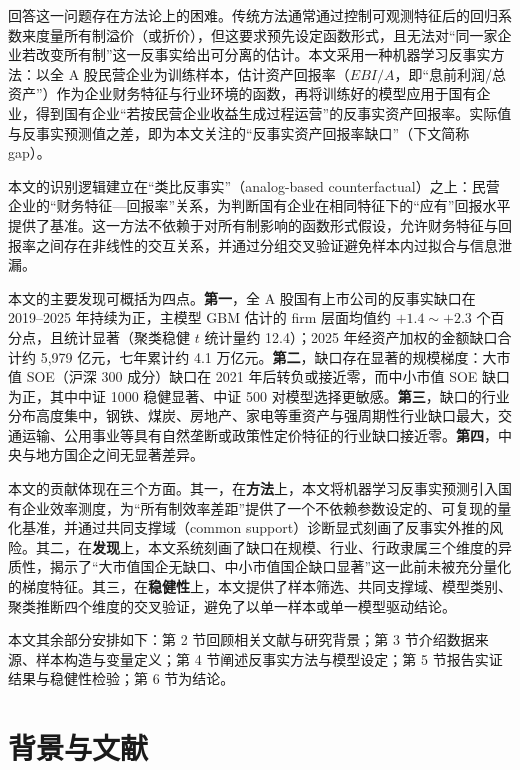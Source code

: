 \documentclass[11pt,a4paper]{ctexart}
\begin{document}
回答这一问题存在方法论上的困难。传统方法通常通过控制可观测特征后的回归系数来度量所有制溢价（或折价），但这要求预先设定函数形式，且无法对“同一家企业若改变所有制”这一反事实给出可分离的估计。本文采用一种机器学习反事实方法：以全 A 股民营企业为训练样本，估计资产回报率（$EBI/A$，即“息前利润/总资产”）作为企业财务特征与行业环境的函数，再将训练好的模型应用于国有企业，得到国有企业“若按民营企业收益生成过程运营”的反事实资产回报率。实际值与反事实预测值之差，即为本文关注的“反事实资产回报率缺口”（下文简称 gap）。

本文的识别逻辑建立在“类比反事实”（analog-based counterfactual）之上：民营企业的“财务特征—回报率”关系，为判断国有企业在相同特征下的“应有”回报水平提供了基准。这一方法不依赖于对所有制影响的函数形式假设，允许财务特征与回报率之间存在非线性的交互关系，并通过分组交叉验证避免样本内过拟合与信息泄漏。

本文的主要发现可概括为四点。\textbf{第一}，全 A 股国有上市公司的反事实缺口在 2019--2025 年持续为正，主模型 GBM 估计的 firm 层面均值约 $+1.4\sim+2.3$ 个百分点，且统计显著（聚类稳健 $t$ 统计量约 12.4）；2025 年经资产加权的金额缺口合计约 5{,}979 亿元，七年累计约 4.1 万亿元。\textbf{第二}，缺口存在显著的规模梯度：大市值 SOE（沪深 300 成分）缺口在 2021 年后转负或接近零，而中小市值 SOE 缺口为正，其中中证 1000 稳健显著、中证 500 对模型选择更敏感。\textbf{第三}，缺口的行业分布高度集中，钢铁、煤炭、房地产、家电等重资产与强周期性行业缺口最大，交通运输、公用事业等具有自然垄断或政策性定价特征的行业缺口接近零。\textbf{第四}，中央与地方国企之间无显著差异。

本文的贡献体现在三个方面。其一，在\textbf{方法}上，本文将机器学习反事实预测引入国有企业效率测度，为“所有制效率差距”提供了一个不依赖参数设定的、可复现的量化基准，并通过共同支撑域（common support）诊断显式刻画了反事实外推的风险。其二，在\textbf{发现}上，本文系统刻画了缺口在规模、行业、行政隶属三个维度的异质性，揭示了“大市值国企无缺口、中小市值国企缺口显著”这一此前未被充分量化的梯度特征。其三，在\textbf{稳健性}上，本文提供了样本筛选、共同支撑域、模型类别、聚类推断四个维度的交叉验证，避免了以单一样本或单一模型驱动结论。

本文其余部分安排如下：第 2 节回顾相关文献与研究背景；第 3 节介绍数据来源、样本构造与变量定义；第 4 节阐述反事实方法与模型设定；第 5 节报告实证结果与稳健性检验；第 6 节为结论。

\section{背景与文献}
\end{document}
